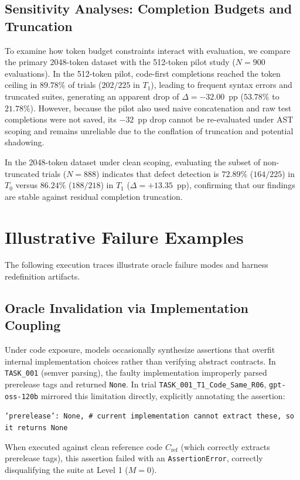 \documentclass[11pt,a4paper]{article}
\begin{document}
\subsection{Sensitivity Analyses: Completion Budgets and Truncation}
\label{sec:sensitivity}
To examine how token budget constraints interact with evaluation, we compare the primary 2048-token dataset with the 512-token pilot study ($N=900$ evaluations).
In the 512-token pilot, code-first completions reached the token ceiling in $89.78\%$ of trials ($202/225$ in $T_1$), leading to frequent syntax errors and truncated suites, generating an apparent drop of $\Delta = -32.00$~pp ($53.78\%$ to $21.78\%$). However, because the pilot also used naive concatenation and raw test completions were not saved, its $-32$~pp drop cannot be re-evaluated under AST scoping and remains unreliable due to the conflation of truncation and potential shadowing.

In the 2048-token dataset under clean scoping, evaluating the subset of non-truncated trials ($N=888$) indicates that defect detection is $72.89\%$ ($164/225$) in $T_0$ versus $86.24\%$ ($188/218$) in $T_1$ ($\Delta = +13.35$~pp), confirming that our findings are stable against residual completion truncation.


\section{Illustrative Failure Examples}
\label{sec:examples}

The following execution traces illustrate oracle failure modes and harness redefinition artifacts.

\subsection{Oracle Invalidation via Implementation Coupling}
Under code exposure, models occasionally synthesize assertions that overfit internal implementation choices rather than verifying abstract contracts. In \texttt{TASK\_001} (semver parsing), the faulty implementation improperly parsed prerelease tags and returned \texttt{None}. In trial \texttt{TASK\_001\_T1\_Code\_Same\_R06}, \texttt{gpt-oss-120b} mirrored this limitation directly, explicitly annotating the assertion:
\begin{center}\vspace{-0.5em}
\small\texttt{'prerelease': None, \# current implementation cannot extract these, so it returns None}
\vspace{-0.5em}\end{center}
When executed against clean reference code $C_{\text{ref}}$ (which correctly extracts prerelease tags), this assertion failed with an \texttt{AssertionError}, correctly disqualifying the suite at Level 1 ($M=0$).
\end{document}
